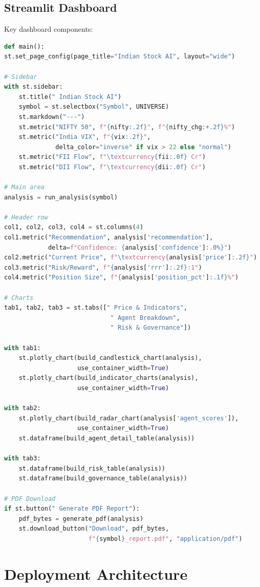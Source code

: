 \documentclass[12pt,a4paper]{report}
\begin{document}
\subsection{Streamlit Dashboard}
Key dashboard components:
\begin{lstlisting}[language=Python, caption=Streamlit Dashboard Structure]
def main():
st.set_page_config(page_title="Indian Stock AI", layout="wide")

# Sidebar
with st.sidebar:
    st.title(" Indian Stock AI")
    symbol = st.selectbox("Symbol", UNIVERSE)
    st.markdown("---")
    st.metric("NIFTY 50", f"{nifty:.2f}", f"{nifty_chg:+.2f}%")
    st.metric("India VIX", f"{vix:.2f}", 
              delta_color="inverse" if vix > 22 else "normal")
    st.metric("FII Flow", f"\textcurrency{fii:.0f} Cr")
    st.metric("DII Flow", f"\textcurrency{dii:.0f} Cr")

# Main area
analysis = run_analysis(symbol)

# Header row
col1, col2, col3, col4 = st.columns(4)
col1.metric("Recommendation", analysis['recommendation'],
            delta=f"Confidence: {analysis['confidence']:.0%}")
col2.metric("Current Price", f"\textcurrency{analysis['price']:.2f}")
col3.metric("Risk/Reward", f"{analysis['rrr']:.2f}:1")
col4.metric("Position Size", f"{analysis['position_pct']:.1f}%")

# Charts
tab1, tab2, tab3 = st.tabs([" Price & Indicators", 
                             " Agent Breakdown", 
                             " Risk & Governance"])

with tab1:
    st.plotly_chart(build_candlestick_chart(analysis), 
                    use_container_width=True)
    st.plotly_chart(build_indicator_charts(analysis), 
                    use_container_width=True)

with tab2:
    st.plotly_chart(build_radar_chart(analysis['agent_scores']), 
                    use_container_width=True)
    st.dataframe(build_agent_detail_table(analysis))

with tab3:
    st.dataframe(build_risk_table(analysis))
    st.dataframe(build_governance_table(analysis))

# PDF Download
if st.button(" Generate PDF Report"):
    pdf_bytes = generate_pdf(analysis)
    st.download_button("Download", pdf_bytes, 
                       f"{symbol}_report.pdf", "application/pdf")
\end{lstlisting}

\section{Deployment Architecture}
\end{document}
